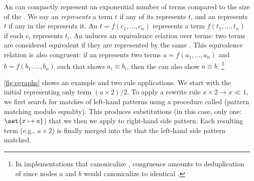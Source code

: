 An \egraph can compactly represent 
 an exponential number of terms compared to the size of the \egraph.
We say an \egraph \emph{represents} a term $t$
 if any of its \eclasses represents $t$,
 and an \eclass represents $t$ 
 if any \enode in the \eclass represents it.
An \enode $t = f(c_1,\ldots, c_n)$
 represents a term $f(t_1,\ldots, t_n)$ 
 if each $c_i$ represents $t_i$.
An \egraph induces an equivalence relation 
 over terms: two terms are considered equivalent 
 if they are represented by the same \eclass.
This equivalence relation is also congruent: 
 if an \egraph represents two terms
 $a = f(a_1,\ldots, a_n)$ and $b = f(b_1,\ldots, b_n)$
 such that \egraph shows $a_i \equiv b_i$,
 then the \egraph can also show $a \equiv b$.%
\footnote{
  In \egraph implementations that canonicalize \enodes,
  congruence amounts to deduplication of \enodes
  since nodes $a$ and $b$ would canonicalize to identical \enodes.
}



\autoref{fig:egraphs} shows an example \egraph 
 and two rule applications.
We start with the initial \egraph representing only term $(a\times 2)/2$.
To apply a rewrite rule $x\times 2\rightarrow x\ll 1$,
 we first search for matches of left-hand patterns 
 using a procedure called \emph{\ematching} (pattern matching modulo equality).
This produces substitutions (in this case, only one: $\set{x \mapsto a}$)
 that we then we apply to right-hand side pattern.
Each resulting term (e.g., $a \times 2$) is finally merged 
 into the \eclass that the left-hand side pattern matched.

